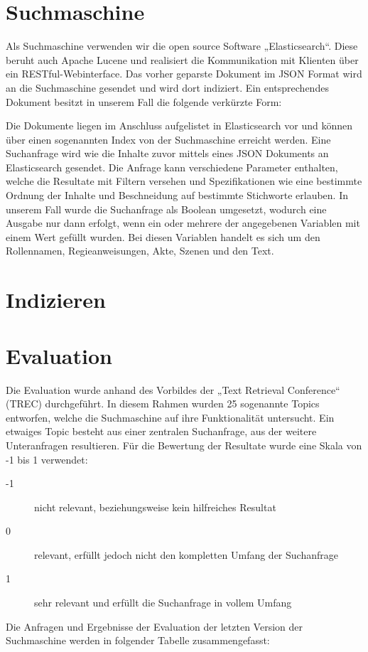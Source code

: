 \section{Suchmaschine}
Als Suchmaschine verwenden wir die open source Software „Elasticsearch“.
Diese beruht auch Apache Lucene
und realisiert die Kommunikation mit Klienten
über ein RESTful-Webinterface.
Das vorher geparste Dokument im JSON Format
wird an die Suchmaschine gesendet und wird dort indiziert.
Ein entsprechendes Dokument besitzt in unserem Fall
die folgende verkürzte Form:
% 

Die Dokumente liegen im Anschluss aufgelistet in Elasticsearch vor
und können über einen sogenannten Index von der Suchmaschine erreicht werden.
Eine Suchanfrage wird wie die Inhalte zuvor mittels eines JSON Dokuments
an Elasticsearch gesendet.
Die Anfrage kann verschiedene Parameter enthalten,
welche die Resultate mit Filtern versehen
und Spezifikationen wie eine bestimmte Ordnung der Inhalte
und Beschneidung auf bestimmte Stichworte erlauben.
In unserem Fall wurde die Suchanfrage als Boolean umgesetzt,
wodurch eine Ausgabe nur dann erfolgt,
wenn ein oder mehrere der angegebenen Variablen mit einem Wert gefüllt wurden. Bei diesen Variablen handelt es sich um den Rollennamen, Regieanweisungen, Akte, Szenen und den Text.

\section{Indizieren}

\section{Evaluation}
Die Evaluation wurde anhand des Vorbildes der „Text Retrieval Conference“ (TREC) durchgeführt. In diesem Rahmen wurden 25 sogenannte Topics entworfen, welche die Suchmaschine auf ihre Funktionalität untersucht. Ein etwaiges Topic besteht aus einer zentralen Suchanfrage, aus der weitere Unteranfragen resultieren. Für die Bewertung der Resultate wurde eine Skala von -1 bis 1 verwendet:
\begin{description}
    \item[-1] nicht relevant, beziehungsweise kein hilfreiches Resultat
    \item[0] relevant, erfüllt jedoch nicht den kompletten Umfang der Suchanfrage
    \item[1] sehr relevant und erfüllt die Suchanfrage in vollem Umfang
\end{description}
Die Anfragen und Ergebnisse der Evaluation der letzten Version der Suchmaschine werden in folgender Tabelle zusammengefasst:

